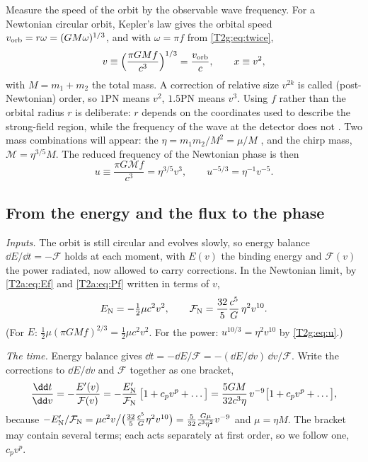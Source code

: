 Measure the speed of the orbit by the observable wave frequency. For a Newtonian circular orbit, Kepler's law gives the orbital speed $v_{\rm orb}=r\omega=(GM\omega)^{1/3}$, and with $\omega=\pi f$ from \eqref{T2g:eq:twice},
\begin{equation}
  v\equiv\Big(\frac{\pi GMf}{c^3}\Big)^{1/3}=\frac{v_{\rm orb}}{c},\qquad x\equiv v^2 ,
  \label{T2g:eq:v}
\end{equation}
with $M=m_1+m_2$ the total mass. A correction of relative size $v^{2k}$ is called  (post-Newtonian) order, so $1$PN means $v^2$, $1.5$PN means $v^3$. Using $f$ rather than the orbital radius $r$ is deliberate: $r$ depends on the coordinates used to describe the strong-field region, while the frequency of the wave at the detector does not \cite[Sec.~III A]{CutlerFlanagan1994}. Two mass combinations will appear: the  $\eta=m_1m_2/M^2=\mu/M$ , and the chirp mass, $\mathcal M=\eta^{3/5}M$. The reduced frequency of the Newtonian phase is then
\begin{equation}
  u\equiv\frac{\pi G\mathcal Mf}{c^3}=\eta^{3/5}v^3,\qquad u^{-5/3}=\eta^{-1}v^{-5}.
  \label{T2g:eq:u}
\end{equation}

\subsection{From the energy and the flux to the phase}

\emph{Inputs.} The orbit is still circular and evolves slowly, so energy balance $\dd E/\dd t=-\mathcal F$ holds at each moment, with $E(v)$ the binding energy and $\mathcal F(v)$ the power radiated, now allowed to carry corrections. In the Newtonian limit, by \eqref{T2a:eq:Ef} and \eqref{T2a:eq:Pf} written in terms of $v$,
\begin{equation}
  E_{\rm N}=-\tfrac12\mu c^2v^2,\qquad
  \mathcal F_{\rm N}=\frac{32}{5}\frac{c^5}{G}\,\eta^2v^{10}.
  \label{T2g:eq:EFnewton}
\end{equation}
(For $E$: $\tfrac12\mu(\pi GMf)^{2/3}=\tfrac12\mu c^2v^2$. For the power: $u^{10/3}=\eta^2v^{10}$ by \eqref{T2g:eq:u}.)

\emph{The time.} Energy balance gives $\dd t=-\dd E/\mathcal F=-(\dd E/\dd v)\,\dd v/\mathcal F$. Write the corrections to $\dd E/\dd v$ and $\mathcal F$ together as one bracket,
\begin{equation}
  \frac{\dd t}{\dd v}=-\frac{E'(v)}{\mathcal F(v)}
  =-\frac{E_{\rm N}'}{\mathcal F_{\rm N}}\,\big[1+c_pv^p+\dots\big]
  =\frac{5GM}{32c^3\eta}\,v^{-9}\big[1+c_pv^p+\dots\big],
  \label{T2g:eq:dtdv}
\end{equation}
because $-E_{\rm N}'/\mathcal F_{\rm N}=\mu c^2v\big/\big(\tfrac{32}{5}\tfrac{c^5}{G}\eta^2v^{10}\big)=\tfrac{5}{32}\tfrac{G\mu}{c^3\eta^2}v^{-9}$ and $\mu=\eta M$. The bracket may contain several terms; each acts separately at first order, so we follow one, $c_pv^p$.

